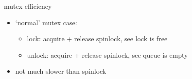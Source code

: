 
\begin{frame}{mutex efficiency}
\begin{itemize}
\item `normal' mutex \textbf{} case:
    \begin{itemize}
    \item lock: acquire + release spinlock, see lock is free
    \item unlock: acquire + release spinlock, see queue is empty
    \end{itemize}
\vspace{.5cm}
\item not much slower than spinlock
\end{itemize}
\end{frame}
